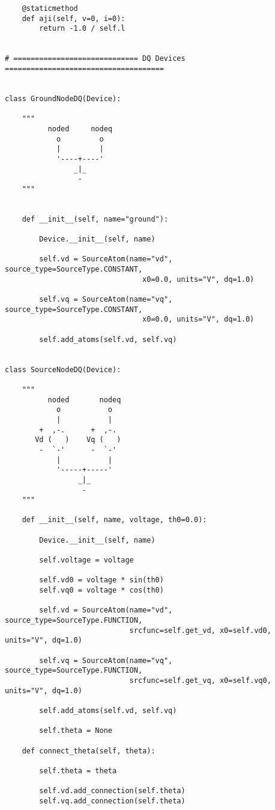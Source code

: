 \begin{lstlisting}
    @staticmethod
    def aji(self, v=0, i=0):
        return -1.0 / self.l


# ============================= DQ Devices =====================================


class GroundNodeDQ(Device):

    """
          noded     nodeq
            o         o
            |         |
            '----+----'
                _|_
                 -
    """


    def __init__(self, name="ground"):

        Device.__init__(self, name)

        self.vd = SourceAtom(name="vd", source_type=SourceType.CONSTANT,
                                x0=0.0, units="V", dq=1.0)

        self.vq = SourceAtom(name="vq", source_type=SourceType.CONSTANT,
                                x0=0.0, units="V", dq=1.0)

        self.add_atoms(self.vd, self.vq)


class SourceNodeDQ(Device):

    """
          noded       nodeq
            o           o
            |           |
        +  ,-.      +  ,-.
       Vd (   )    Vq (   )
        -  `-'      -  `-'
            |           |
            '-----+-----'
                 _|_
                  -
    """

    def __init__(self, name, voltage, th0=0.0):

        Device.__init__(self, name)

        self.voltage = voltage

        self.vd0 = voltage * sin(th0)
        self.vq0 = voltage * cos(th0)

        self.vd = SourceAtom(name="vd", source_type=SourceType.FUNCTION,
                             srcfunc=self.get_vd, x0=self.vd0, units="V", dq=1.0)

        self.vq = SourceAtom(name="vq", source_type=SourceType.FUNCTION,
                             srcfunc=self.get_vq, x0=self.vq0, units="V", dq=1.0)

        self.add_atoms(self.vd, self.vq)

        self.theta = None

    def connect_theta(self, theta):

        self.theta = theta

        self.vd.add_connection(self.theta)
        self.vq.add_connection(self.theta)


\end{lstlisting}
